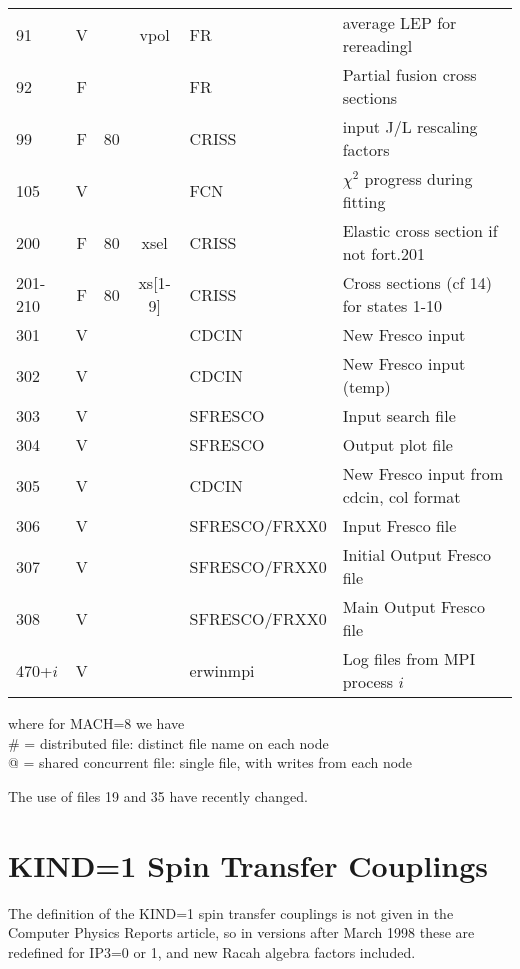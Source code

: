 \documentclass[11pt]{article}
\begin{document}
{\begin{tabular}{|l | c c c | l | l|}
91    &  V &           &vpol &       FR   &   average LEP for rereadingl\\
92    &   F &            &    &     FR& Partial fusion cross sections\\
99     & F &    80   & &     CRISS   &  input J/L rescaling factors\\
105     & V &         & &     FCN   &  $\chi^2$ progress during fitting\\
200 & F & 80     &xsel &     CRISS   & Elastic cross section if not fort.201 \\
201-210 & F & 80     &xs[1-9] &     CRISS   & Cross sections (cf 14) for states 1-10\\
301 & V &      & &     CDCIN   & New Fresco input \\
302 & V &      & &     CDCIN   & New Fresco input  (temp) \\
303 & V &      & &     SFRESCO   & Input search file \\
304 & V &      & &     SFRESCO   & Output plot file \\
305 & V &      & &     CDCIN   & New Fresco input from cdcin, col format \\
306 & V &      & &     SFRESCO/FRXX0   & Input Fresco file \\
307 & V &      & &     SFRESCO/FRXX0   & Initial Output Fresco file \\
308 & V &      & &     SFRESCO/FRXX0   & Main Output Fresco file \\
470+$i$ & V &       & &     erwinmpi   & Log files from MPI process $i$ \\
\hline
\end{tabular}
}

where  for MACH=8 we have\\
\#  = distributed file: distinct file name on each node\\
@  = shared concurrent file: single file, with writes from each node

The use of files 19 and 35 have recently changed.

\newpage
\section{KIND=1 Spin Transfer Couplings}
\label{spintransfers}
The definition of the KIND=1 spin transfer couplings is not given
in the Computer Physics Reports article, so in versions after March 1998 these
are redefined for IP3=0 or 1, and new Racah algebra factors included.
\end{document}
